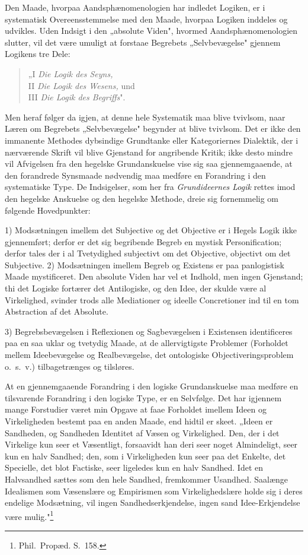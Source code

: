 \documentclass[12pt]{book}
\begin{document}
Den Maade, hvorpaa Aandsphænomenologien har indledet Logiken, er i systematisk
Overeensstemmelse med den Maade, hvorpaa Logiken inddeles og udvikles. Uden
Indsigt i den „absolute Viden", hvormed Aandsphænomenologien slutter, vil det være
umuligt at forstaae Begrebets „Selvbevægelse" gjennem Logikens tre Dele:
\begin{quote}
„I \emph{Die Logik des Seyns,}\\
II \emph{Die Logik des Wesens,} und\\
III \emph{Die Logik des Begriffs}".
\end{quote}
Men heraf følger da igjen, at denne hele Systematik maa blive tvivlsom, naar Læren
om Begrebets „Selvbevægelse" begynder at blive tvivlsom. Det er ikke den immanente
Methodes dybsindige Grundtanke eller Kategoriernes Dialektik, der i nærværende
Skrift vil blive Gjenstand for angribende Kritik; ikke desto mindre vil Afvigelsen
fra den hegelske Grundanskuelse vise sig saa gjennemgaaende, at den forandrede
Synsmaade nødvendig maa medføre en Forandring i den systematiske Type. De
Indsigelser, som her fra \emph{Grundideernes Logik} rettes imod den hegelske
Anskuelse og den hegelske Methode, dreie sig fornemmelig om følgende Hovedpunkter:

1) Modsætningen imellem det Subjective og det Objective er i Hegels Logik ikke
gjennemført; derfor er det sig begribende Begreb en mystisk Personification;
derfor tales der i al Tvetydighed subjectivt om det Objective, objectivt om det
Subjective.
2) Modsætningen imellem Begreb og Existens er paa panlogistisk Maade mystificeret.
Den absolute Viden har vel et Indhold, men ingen Gjenstand; thi det Logiske
fortærer det Antilogiske, og den Idee, der skulde være al Virkelighed, svinder
trods alle Mediationer og ideelle Concretioner ind til en tom Abstraction af det
Absolute.

3) Begrebsbevægelsen i Reflexionen og Sagbevægelsen i Existensen identificeres paa
en saa uklar og tvetydig Maade, at de allervigtigste Problemer (Forholdet mellem
Ideebevægelse og Realbevægelse, det ontologiske Objectiveringsproblem o.\ s.\ v.)
tilbagetrænges og tilsløres.

At en gjennemgaaende Forandring i den logiske Grundanskuelse maa medføre en
tilsvarende Forandring i den logiske Type, er en Selvfølge. Det har igjennem mange
Forstudier været min Opgave at faae Forholdet imellem Ideen og Virkeligheden
bestemt paa en anden Maade, end hidtil er skeet. „Ideen er Sandheden, og Sandheden
Identitet af Væsen og Virkelighed. Den, der i det Virkelige kun seer et Væsentligt,
forsaavidt han deri seer noget Almindeligt, seer kun en halv Sandhed; den, som i
Virkeligheden kun seer paa det Enkelte, det Specielle, det blot Factiske, seer
ligeledes kun en halv Sandhed. Idet en Halvsandhed sættes som den hele Sandhed,
fremkommer Usandhed. Saalænge Idealismen som Væsenslære og Empirismen som
Virkelighedslære holde sig i deres endelige Modsætning, vil ingen
Sandhedserkjendelse, ingen sand Idee-Erkjendelse være mulig."\footnote{Phil.\
Propæd. S.~158.}
\end{document}
